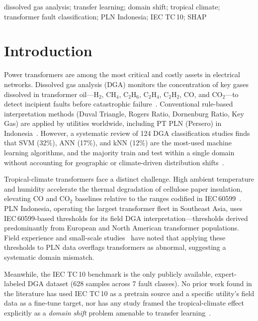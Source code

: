 \documentclass[conference]{IEEEtran}
\begin{document}
\begin{IEEEkeywords}
dissolved gas analysis; transfer learning; domain shift;
tropical climate; transformer fault classification;
PLN Indonesia; IEC TC\,10; SHAP
\end{IEEEkeywords}

\section{Introduction}
\label{sec:intro}

Power transformers are among the most critical and costly assets in
electrical networks.
Dissolved gas analysis (DGA) monitors the concentration of key gases
dissolved in transformer oil---H$_2$, CH$_4$, C$_2$H$_6$, C$_2$H$_4$,
C$_2$H$_2$, CO, and CO$_2$---to detect incipient faults before
catastrophic failure~\cite{DladlaThango2025}.
Conventional rule-based interpretation methods (Duval Triangle,
Rogers Ratio, Dornenburg Ratio, Key Gas) are applied by utilities
worldwide, including PT PLN (Persero) in Indonesia~\cite{RahmandaSuwarno2022}.
However, a systematic review of 124 DGA classification studies finds
that SVM (32\%), ANN (17\%), and kNN (12\%) are the most-used
machine learning algorithms, and the majority train and test within
a single domain without accounting for geographic or
climate-driven distribution shifts~\cite{DladlaThango2025}.

Tropical-climate transformers face a distinct challenge.
High ambient temperature and humidity accelerate the thermal
degradation of cellulose paper insulation,
elevating CO and CO$_2$ baselines relative to the ranges
codified in IEC\,60599~\cite{IEC60599}.
PLN Indonesia, operating the largest transformer fleet in Southeast
Asia, uses IEC\,60599-based thresholds for its field DGA
interpretation---thresholds derived predominantly from European and
North American transformer populations.
Field experience and small-scale studies~\cite{SutiknoPrasojo2024}
have noted that applying these thresholds to PLN data
overflags transformers as abnormal,
suggesting a systematic domain mismatch.

Meanwhile, the IEC TC\,10 benchmark is the only publicly available,
expert-labeled DGA dataset (628 samples across 7 fault classes).
No prior work found in the literature has used IEC TC\,10 as
a pretrain source and a specific utility's field data as a
fine-tune target, nor has any study framed the tropical-climate
effect explicitly as a \emph{domain shift} problem amenable to
transfer learning~\cite{DladlaThango2025}.
\end{document}
